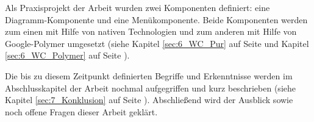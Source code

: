 Als Praxisprojekt der Arbeit wurden zwei Komponenten definiert: eine Diagramm-Komponente und eine Menükomponente. Beide Komponenten werden zum einen mit Hilfe von nativen Technologien und zum anderen mit Hilfe von Google-Polymer umgesetzt (siehe Kapitel \ref{sec:6_WC_Pur} auf Seite \pageref{sec:6_WC_Pur} und Kapitel \ref{sec:6_WC_Polymer} auf Seite \pageref{sec:6_WC_Polymer}).

Die bis zu diesem Zeitpunkt definierten Begriffe und Erkenntnisse werden im Abschlusskapitel der Arbeit nochmal aufgegriffen und kurz beschrieben (siehe Kapitel \ref{sec:7_Konklusion} auf Seite \pageref{sec:7_Konklusion}). Abschließend wird der Ausblick sowie noch offene Fragen dieser Arbeit geklärt.